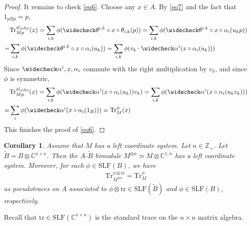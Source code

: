\documentclass[11pt,b5paper,notitlepage]{article}
\theoremstyle{definition}
\theoremstyle{plain}
\newtheorem{co}[df]{Corollary}
\newcommand{\wtd}{\widetilde}
\newcommand{\wch}{\widecheck}
\newcommand{\Tr}{\mathrm{Tr}}
\newcommand{\Cbb}{\mathbb C}
\newcommand{\Zbb}{\mathbb Z}
\newcommand{\SLF}{\mathrm{SLF}}
\newcommand{\trc}{\mathrm{tr}}
\numberwithin{equation}{section}
\begin{document}
\begin{proof}
It remains to check \eqref{eq6}. Choose any $x\in A$. By \eqref{eq7} and the fact that $1_{pBp}=p$,
\begin{align*}
&\Tr_{Mp}^{\phi|_{pBp}}(x)=\sum_{i,k}\phi(\wch\theta^{i,k}\circ x\circ \theta_{i,k}(p))=\sum_{i,k}\phi(\wch\theta^{i,k}\circ x\circ \alpha_i(u_kp))\\
=&\sum_{i,k}\phi(\wch\theta^{i,k}\circ x\circ \alpha_i(u_k))=\sum_{i,k}\phi(v_k\cdot\wch\alpha^i(x\circ\alpha_i(u_k)))
\end{align*}
Since $\wch\alpha^i,x,\alpha_i$ commute with the right multiplication by $v_k$, and since $\phi$ is symmetric, 
\begin{align*}
&\Tr_{Mp}^{\phi|_{pBp}}(x)=\sum_{i,k}\phi(\wch\alpha^i(x\circ\alpha_i(u_k))v_k)=\sum_{i,k}\phi(\wch\alpha^i(x\circ\alpha_i(u_kv_k)))\\
=&\sum_{i}\phi(\wch\alpha^i(x\circ\alpha_i(1_B)))=\Tr_M^\phi(x)
\end{align*}
This finishes the proof of \eqref{eq6}.
\end{proof}



\begin{co}\label{lb46}
	Assume that $M$ has a left coordinate system. Let $n\in\Zbb_+$. Let $\wtd B=B\otimes\Cbb^{n\times n}$. Then the $A$-$\wtd B$ bimodule $M^{\oplus n}\simeq M\otimes\Cbb^{1,n}$ has a left coordinate system. Moreover, for each $\phi\in\SLF(B)$, we have
\begin{align}\label{eq8}
\Tr^{\phi\otimes\trc}_{M^{\oplus n}}=\Tr^\phi_M
\end{align}
as pseudotraces on $A$ associated to $\phi\otimes\trc\in\SLF(\wtd B)$ and $\phi\in\SLF(B)$, respectively.
\end{co}

Recall that $\trc\in\SLF(\Cbb^{n\times n})$ is the standard trace on the $n\times n$ matrix algebra.
\end{document}
